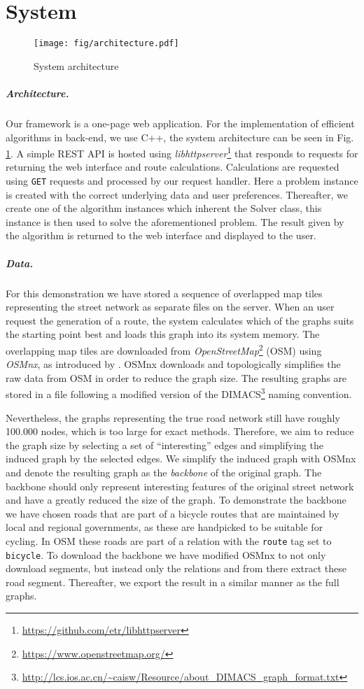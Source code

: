 \documentclass[sigconf,natbib=false]{acmart}
\begin{document}
\section{System}
\label{sec:system}

\begin{figure}[b]
    \centering
    \texttt{[image: fig/architecture.pdf]}
    \caption{System architecture}
    \label{fig:architecture}
\end{figure}

\subparagraph*{\textbf{Architecture.}}
Our framework is a one-page web application. For the implementation of efficient algorithms in back-end, we use C++, the system architecture can be seen in Fig. \ref{fig:architecture}. 
A simple REST API is hosted using \emph{libhttpserver}\footnote{\url{https://github.com/etr/libhttpserver}} that responds to requests for returning the web interface and route calculations. 
Calculations are requested using \texttt{GET} requests and processed by our request handler. 
Here a problem instance is created with the correct underlying data and user preferences. 
Thereafter, we create one of the algorithm instances which inherent the Solver class, this instance is then used to solve the aforementioned problem.
The result given by the algorithm is returned to the web interface and displayed to the user.

\subparagraph*{\textbf{Data.}}
For this demonstration we have stored a sequence of overlapped map tiles representing the street network as separate files on the server.
When an user request the generation of a route, the system calculates which of the graphs suits the starting point best and loads this graph into its system memory.
The overlapping map tiles are downloaded from \emph{OpenStreetMap}\footnote{\url{https://www.openstreetmap.org/}} (OSM) using \emph{OSMnx}, as introduced by \cite{BOEING2017126}. 
OSMnx downloads and topologically simplifies the raw data from OSM in order to reduce the graph size. 
The resulting graphs are stored in a file following a modified version of the DIMACS\footnote{\url{http://lcs.ios.ac.cn/~caisw/Resource/about_DIMACS_graph_format.txt}} naming convention.

Nevertheless, the graphs representing the true road network still have roughly 100.000 nodes, which is too large for exact methods. 
Therefore, we aim to reduce the graph size by selecting a set of ``interesting'' edges and simplifying the induced graph by the selected edges. 
We simplify the induced graph with OSMnx and denote the resulting graph as the \emph{backbone} of the original graph.
The backbone should only represent interesting features of the original street network and have a greatly reduced the size of the graph.
To demonstrate the backbone we have chosen roads that are part of a bicycle routes that are maintained by local and regional governments, as these are handpicked to be suitable for cycling.
In OSM these roads are part of a relation with the \texttt{route} tag set to \texttt{bicycle}.
To download the backbone we have modified OSMnx to not only download segments, but instead only the relations and from there extract these road segment.
Thereafter, we export the result in a similar manner as the full graphs.
\end{document}
